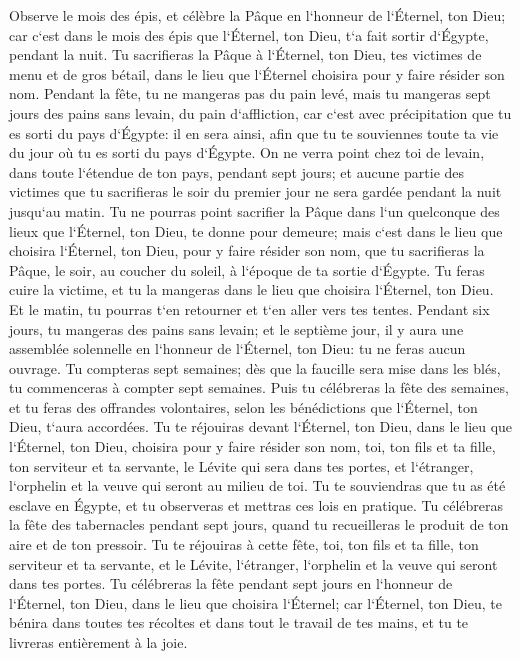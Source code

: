 \verse Observe le mois des épis, et célèbre la Pâque en l`honneur de l`Éternel, ton Dieu; car c`est dans le mois des épis que l`Éternel, ton Dieu, t`a fait sortir d`Égypte, pendant la nuit. 
\verse Tu sacrifieras la Pâque à l`Éternel, ton Dieu, tes victimes de menu et de gros bétail, dans le lieu que l`Éternel choisira pour y faire résider son nom. 
\verse Pendant la fête, tu ne mangeras pas du pain levé, mais tu mangeras sept jours des pains sans levain, du pain d`affliction, car c`est avec précipitation que tu es sorti du pays d`Égypte: il en sera ainsi, afin que tu te souviennes toute ta vie du jour où tu es sorti du pays d`Égypte. 
\verse On ne verra point chez toi de levain, dans toute l`étendue de ton pays, pendant sept jours; et aucune partie des victimes que tu sacrifieras le soir du premier jour ne sera gardée pendant la nuit jusqu`au matin. 
\verse Tu ne pourras point sacrifier la Pâque dans l`un quelconque des lieux que l`Éternel, ton Dieu, te donne pour demeure; 
\verse mais c`est dans le lieu que choisira l`Éternel, ton Dieu, pour y faire résider son nom, que tu sacrifieras la Pâque, le soir, au coucher du soleil, à l`époque de ta sortie d`Égypte. 
\verse Tu feras cuire la victime, et tu la mangeras dans le lieu que choisira l`Éternel, ton Dieu. Et le matin, tu pourras t`en retourner et t`en aller vers tes tentes. 
\verse Pendant six jours, tu mangeras des pains sans levain; et le septième jour, il y aura une assemblée solennelle en l`honneur de l`Éternel, ton Dieu: tu ne feras aucun ouvrage. 
\verse Tu compteras sept semaines; dès que la faucille sera mise dans les blés, tu commenceras à compter sept semaines. 
\verse Puis tu célébreras la fête des semaines, et tu feras des offrandes volontaires, selon les bénédictions que l`Éternel, ton Dieu, t`aura accordées. 
\verse Tu te réjouiras devant l`Éternel, ton Dieu, dans le lieu que l`Éternel, ton Dieu, choisira pour y faire résider son nom, toi, ton fils et ta fille, ton serviteur et ta servante, le Lévite qui sera dans tes portes, et l`étranger, l`orphelin et la veuve qui seront au milieu de toi. 
\verse Tu te souviendras que tu as été esclave en Égypte, et tu observeras et mettras ces lois en pratique. 
\verse Tu célébreras la fête des tabernacles pendant sept jours, quand tu recueilleras le produit de ton aire et de ton pressoir. 
\verse Tu te réjouiras à cette fête, toi, ton fils et ta fille, ton serviteur et ta servante, et le Lévite, l`étranger, l`orphelin et la veuve qui seront dans tes portes. 
\verse Tu célébreras la fête pendant sept jours en l`honneur de l`Éternel, ton Dieu, dans le lieu que choisira l`Éternel; car l`Éternel, ton Dieu, te bénira dans toutes tes récoltes et dans tout le travail de tes mains, et tu te livreras entièrement à la joie. 
